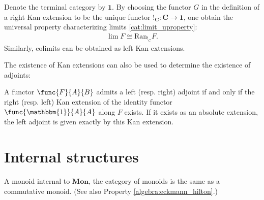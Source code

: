     \begin{example}[Limit]
        Denote the terminal category by $\mathbf{1}$. By choosing the functor $G$ in the definition of a right Kan extension to be the unique functor $!_{\mathbf{C}}:\mathbf{C}\rightarrow\mathbf{1}$, one obtain the universal property characterizing limits \ref{cat:limit_uproperty}:
        \begin{gather}
            \lim F\cong\mathrm{Ran}_{!_C}F.
        \end{gather}
        Similarly, colimits can be obtained as left Kan extensions.
    \end{example}

    The existence of Kan extensions can also be used to determine the existence of adjoints:
    \begin{property}
        A functor $\func{F}{A}{B}$ admits a left (resp. right) adjoint if and only if the right (resp. left) Kan extension of the identity functor $\func{\mathbbm{1}}{A}{A}$ along $F$ exists. If it exists as an absolute extension, the left adjoint is given exactly by this Kan extension.
    \end{property}


\section{Internal structures}

    \begin{property}\label{cat:eckmann_hilton}
        A monoid internal to $\mathbf{Mon}$, the category of monoids is the same as a commutative monoid. (See also Property \ref{algebra:eckmann_hilton}.)
    \end{property}

